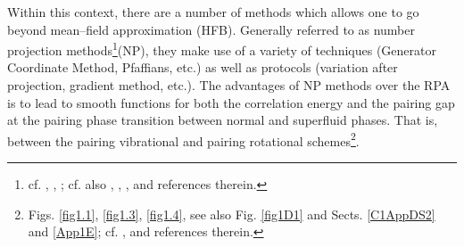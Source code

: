   
  Within this context, there are a number of methods which allows one to go beyond mean--field approximation (HFB). Generally referred to as number projection methods\footnote{cf. \cite{Ring:80}, \cite{Egido:13}, \cite{Robledo:13}; cf. also \cite{Frauendorf:13}, \cite{Ring:13}, \cite{Heenen:13}, and references therein.}(NP), they make use of a variety of techniques (Generator Coordinate Method, Pfaffians, etc.) as well as protocols (variation after projection, gradient method, etc.). The advantages of NP methods over the RPA is to lead to smooth functions for both the correlation energy and the pairing gap at the pairing phase transition between normal and superfluid phases. That is, between the pairing vibrational and pairing rotational schemes\footnote{Figs. \ref{fig1.1}, \ref{fig1.3}, \ref{fig1.4}, see also Fig. \ref{fig1D1} and Sects. \ref{C1AppDS2} and \ref{App1E}; cf. \cite{Bes:66}, \cite{Bohr:75} and references therein.}.
